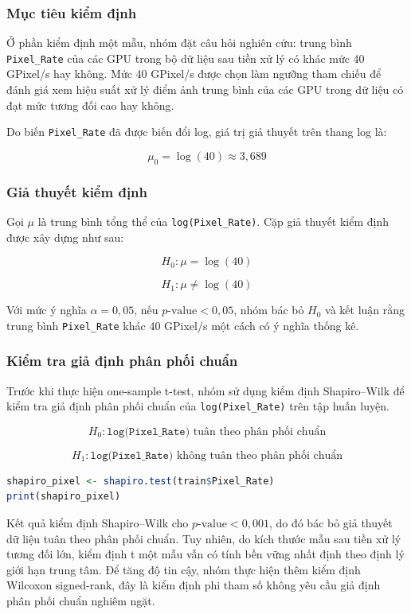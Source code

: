 \subsubsection{Mục tiêu kiểm định}

Ở phần kiểm định một mẫu, nhóm đặt câu hỏi nghiên cứu: trung bình \texttt{Pixel\_Rate} của các GPU trong bộ dữ liệu sau tiền xử lý có khác mức 40 GPixel/s hay không. Mức 40 GPixel/s được chọn làm ngưỡng tham chiếu để đánh giá xem hiệu suất xử lý điểm ảnh trung bình của các GPU trong dữ liệu có đạt mức tương đối cao hay không.

Do biến \texttt{Pixel\_Rate} đã được biến đổi log, giá trị giả thuyết trên thang log là:

\[
\mu_0 = \log(40) \approx 3{,}689
\]

\subsubsection{Giả thuyết kiểm định}

Gọi $\mu$ là trung bình tổng thể của \texttt{log(Pixel\_Rate)}. Cặp giả thuyết kiểm định được xây dựng như sau:

\[
H_0: \mu = \log(40)
\]

\[
H_1: \mu \neq \log(40)
\]

Với mức ý nghĩa $\alpha = 0{,}05$, nếu $p\text{-value} < 0{,}05$, nhóm bác bỏ $H_0$ và kết luận rằng trung bình \texttt{Pixel\_Rate} khác 40 GPixel/s một cách có ý nghĩa thống kê.

\subsubsection{Kiểm tra giả định phân phối chuẩn}

Trước khi thực hiện one-sample t-test, nhóm sử dụng kiểm định Shapiro--Wilk để kiểm tra giả định phân phối chuẩn của \texttt{log(Pixel\_Rate)} trên tập huấn luyện.

\[
H_0: \texttt{log(Pixel\_Rate)} \text{ tuân theo phân phối chuẩn}
\]

\[
H_1: \texttt{log(Pixel\_Rate)} \text{ không tuân theo phân phối chuẩn}
\]

\begin{lstlisting}[language=R, caption={Kiểm tra phân phối chuẩn cho log(Pixel\_Rate)}]
shapiro_pixel <- shapiro.test(train$Pixel_Rate)
print(shapiro_pixel)
\end{lstlisting}
Kết quả kiểm định Shapiro--Wilk cho $p\text{-value} < 0{,}001$, do đó bác bỏ giả thuyết dữ liệu tuân theo phân phối chuẩn. Tuy nhiên, do kích thước mẫu sau tiền xử lý tương đối lớn, kiểm định t một mẫu vẫn có tính bền vững nhất định theo định lý giới hạn trung tâm. Để tăng độ tin cậy, nhóm thực hiện thêm kiểm định Wilcoxon signed-rank, đây là kiểm định phi tham số không yêu cầu giả định phân phối chuẩn nghiêm ngặt.

